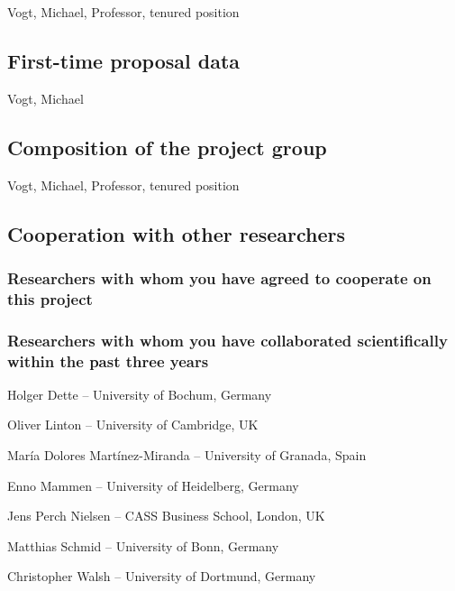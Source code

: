 \documentclass[a4paper,12pt]{article}
\begin{document}
Vogt, Michael, Professor, tenured position

\subsection{First-time proposal data}

Vogt, Michael

\subsection{Composition of the project group}
Vogt, Michael, Professor, tenured position

\subsection{Cooperation with other researchers}

\subsubsection{Researchers with whom you have agreed to cooperate on this project}

\subsubsection{Researchers with whom you have collaborated scientifically within the past three years}

\noindent Holger Dette -- University of Bochum, Germany 

\noindent Oliver Linton -- University of Cambridge, UK

\noindent Mar\'ia Dolores Mart\'inez-Miranda -- University of Granada, Spain

\noindent Enno Mammen -- University of Heidelberg, Germany

\noindent Jens Perch Nielsen -- CASS Business School, London, UK 

\noindent Matthias Schmid -- University of Bonn, Germany

\noindent Christopher Walsh -- University of Dortmund, Germany 
\end{document}
